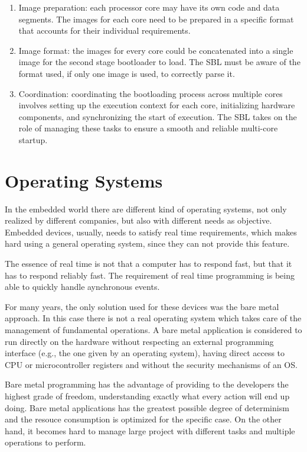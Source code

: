 \begin{enumerate}
    \item   Image preparation: each processor core may have its own code and
            data segments. The images for each core need to be prepared in a
            specific format that accounts for their individual requirements.

    \item   Image format: the images for every core could be concatenated into
            a single image for the second stage bootloader to load.
            The SBL must be aware of the format used, if only one image is
            used, to correctly parse it.

    \item   Coordination: coordinating the bootloading process across multiple
            cores involves setting up the execution context for each core,
            initializing hardware components, and synchronizing the start of
            execution. The SBL takes on the role of managing these tasks to
            ensure a smooth and reliable multi-core startup.
\end{enumerate}

\section{Operating Systems}

In the embedded world there are different kind of operating systems, not only
realized by different companies, but also with different needs as objective.
Embedded devices, usually, needs to satisfy real time requirements, which
makes hard using a general operating system, since they can not provide
this feature.

The essence of real time is not that a computer has to respond fast, but that
it has to respond reliably fast.
The requirement of real time programming is being able to quickly handle
aynchronous events. \cite{abbott2011linux} 

For many years, the only solution used for these devices was the bare metal
approach. In this case there is not a real operating system which takes care
of the management of fundamental operations.
A bare metal application is considered to run directly on the hardware without
respecting an external programming interface 
(e.g., the one given by an operating system), having direct access to CPU
or microcontroller registers and without the security mechanisms of an OS.

Bare metal programming has the advantage of providing to the developers the
highest grade of freedom, understanding exactly what every action will end up
doing. Bare metal applications has the greatest possible degree of 
determinism and the resouce consumption is optimized for the specific case. 
On the other hand, it becomes hard to manage large project with different tasks
and multiple operations to perform.

